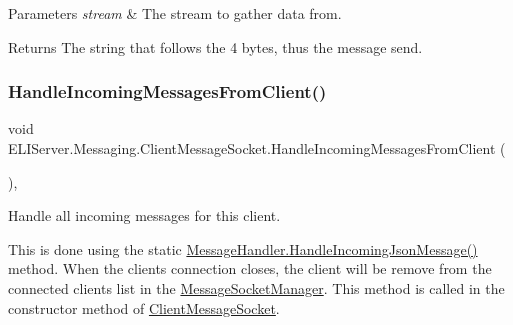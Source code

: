 \begin{DoxyParams}{Parameters}
{\em stream} & The stream to gather data from.\\
\hline
\end{DoxyParams}
\begin{DoxyReturn}{Returns}
The string that follows the 4 bytes, thus the message send.
\end{DoxyReturn}
\mbox{\label{class_e_l_i_server_1_1_messaging_1_1_client_message_socket_a79f0022875996b0902f22bf3db2eed9b}} 
\subsubsection{\texorpdfstring{Handle\+Incoming\+Messages\+From\+Client()}{HandleIncomingMessagesFromClient()}}
{\footnotesize\ttfamily void E\+L\+I\+Server.\+Messaging.\+Client\+Message\+Socket.\+Handle\+Incoming\+Messages\+From\+Client (\begin{DoxyParamCaption}{ }\end{DoxyParamCaption})\hspace{0.3cm}{\ttfamily [inline]}, {\ttfamily [private]}}





Handle all incoming messages for this client.

This is done using the static \hyperlink{class_e_l_i_server_1_1_messaging_1_1_message_handler_a54b8fc68511fe197932338c0ffdb75c0}{Message\+Handler.\+Handle\+Incoming\+Json\+Message()} method. When the clients\textquotesingle{} connection closes, the client will be remove from the connected clients list in the \hyperlink{class_e_l_i_server_1_1_message_socket_manager}{Message\+Socket\+Manager}. This method is called in the constructor method of \hyperlink{class_e_l_i_server_1_1_messaging_1_1_client_message_socket}{Client\+Message\+Socket}. \mbox{\label{class_e_l_i_server_1_1_messaging_1_1_client_message_socket_a6068ed137f8fa6fcafcfe24764444ca5}} 
